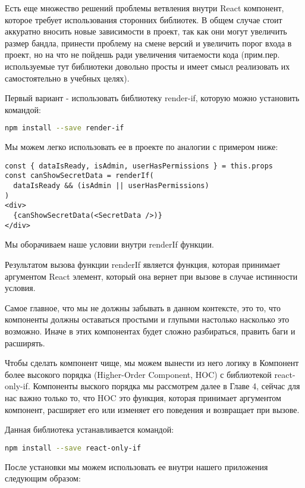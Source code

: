 \documentclass[12pt]{book}
\begin{document}
Есть еще множество решений проблемы ветвления внутри React компонент, которое требует использования сторонних библиотек. В общем случае стоит аккуратно вносить новые зависимости в проект, так как они могут увеличить размер бандла, принести проблему на смене версий и увеличить порог входа в проект, но на что не пойдешь ради увеличения читаемости кода (прим.пер. используемые тут библиотеки довольно просты и имеет смысл реализовать их самостоятельно в учебных целях).

Первый вариант - использовать библиотеку render-if, которую можно установить командой:
\begin{lstlisting}[language=bash]
npm install --save render-if
\end{lstlisting}

Мы можем легко использовать ее в проекте по аналогии с примером ниже:

\begin{lstlisting}
const { dataIsReady, isAdmin, userHasPermissions } = this.props
const canShowSecretData = renderIf(
  dataIsReady && (isAdmin || userHasPermissions)
)
<div>
  {canShowSecretData(<SecretData />)}
</div>
\end{lstlisting}


Мы оборачиваем наше условии внутри renderIf функции.

Результатом вызова функции renderIf является функция, которая принимает аргументом React элемент, который она вернет при вызове в случае истинности условия.

Самое главное, что мы не должны забывать в данном контексте, это то, что компоненты должны оставаться простыми и глупыми настолько насколько это возможно. Иначе в этих компонентах будет сложно разбираться, править баги и расширять.

Чтобы сделать компонент чище, мы можем вынести из него логику в Компонент более высокого порядка (Higher-Order Component, HOC) с библиотекой react-only-if. Компоненты выского порядка мы рассмотрем далее в Главе 4, сейчас для нас важно только то, что HOC это функция, которая принимает аргументом компонент, расширяет его или изменяет его поведения и возвращает при вызове.

Данная библиотека устанавливается командой:

\begin{lstlisting}[language=bash]
npm install --save react-only-if
\end{lstlisting}

После установки мы можем использовать ее внутри нашего приложения следующим образом:
\end{document}
